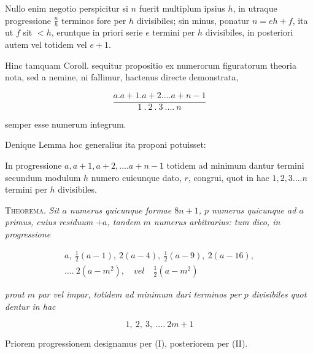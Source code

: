 Nullo enim negotio perspicitur si $n$ fuerit multiplum ipsius $h$, in utraque progressione $\frac nh$ terminos fore per $h$ divisibiles; sin minus, ponatur $n=eh+f$, ita ut $f$ sit $<h$, eruntque in priori serie $e$ termini per $h$ divisibiles, in posteriori autem vel totidem vel $e+1$.

Hinc tamquam Coroll. sequitur propositio ex numerorum figuratorum theoria nota, sed a nemine, ni fallimur, hactenus directe demonstrata,

\[
\frac{a.a+1.a+2....a+n-1}{1\ .\ 2\ .\ 3\ ....\ n}
\]

semper esse numerum integrum.

Denique Lemma hoc generalius ita proponi potuisset:

In progressione $a,a+1,a+2,....a+n-1$ totidem ad minimum dantur termini secundum modulum $h$ numero cuicunque dato, $r$, congrui, quot in hac $1,2,3....n$ termini per $h$ divisibiles.


\textsc{Theorema.} \textit{Sit $a$ numerus quicunque formae $8n+1$, $p$ numerus quicunque ad $a$ primus, cuius residuum $+a$, tandem $m$ numerus arbitrarius: tum dico, in progressione}

\[
\begin{gathered}a,\ \tfrac12(a-1),\ 2(a-4),\ \tfrac12(a-9),\ 2(a-16),\\ ....\ 2(a-m^2),\quad\textit{vel}\quad\tfrac12(a-m^2)\end{gathered}
\]

\textit{prout $m$ par vel impar, totidem ad minimum dari terminos per $p$ divisibiles quot dentur in hac}

\[
1,\ 2,\ 3,\ ....\ 2m+1
\]

Priorem progressionem designamus per (I), posteriorem per (II).
